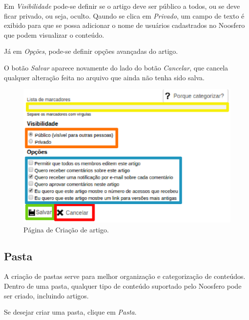 Em \emph{\color{orange}Visibilidade} pode-se definir se o artigo deve ser público a todos, ou se deve ficar privado, ou seja, oculto. Qaundo se clica em \emph{Privado}, um campo de texto é exibido para que se possa adicionar o nome de usuários cadastrados no Noosfero que podem visualizar o conteúdo.

Já em \emph{\color{blue}Opções}, pode-se definir opções avançadas do artigo.

O botão \emph{\color{green}Salvar} aparece novamente do lado do botão \emph{\color{red}Cancelar}, que cancela qualquer alteração feita no arquivo que ainda não tenha sido salva.

\begin{figure}[H]
  \centering
    \includegraphics[keepaspectratio=true,scale=0.7]{figuras/opcoesArtigo.eps}
  \caption{Página de Criação de artigo.}
  \label{fig:FormCriacaoPasta}
\end{figure}

\newpage
\subsection{Pasta}
\label{subsec:pasta}

A criação de pastas serve para melhor organização e categorização de conteúdos. Dentro de uma pasta, qualquer tipo de conteúdo suportado pelo Noosfero pode ser criado, incluindo artigos.

Se desejar criar uma pasta, clique em \emph{\color{red}Pasta}.

